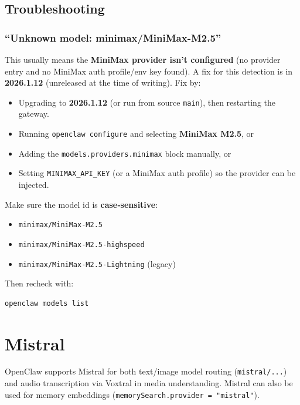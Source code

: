 \subsection{Troubleshooting}


\subsubsection{“Unknown model: minimax/MiniMax-M2.5”}


This usually means the \textbf{MiniMax provider isn’t configured} (no provider entry
and no MiniMax auth profile/env key found). A fix for this detection is in
\textbf{2026.1.12} (unreleased at the time of writing). Fix by:

\begin{itemize}
  \item Upgrading to \textbf{2026.1.12} (or run from source \texttt{main}), then restarting the gateway.
  \item Running \texttt{openclaw configure} and selecting \textbf{MiniMax M2.5}, or
  \item Adding the \texttt{models.providers.minimax} block manually, or
  \item Setting \texttt{MINIMAX\_API\_KEY} (or a MiniMax auth profile) so the provider can be injected.
\end{itemize}


Make sure the model id is \textbf{case‑sensitive}:

\begin{itemize}
  \item \texttt{minimax/MiniMax-M2.5}
  \item \texttt{minimax/MiniMax-M2.5-highspeed}
  \item \texttt{minimax/MiniMax-M2.5-Lightning} (legacy)
\end{itemize}


Then recheck with:

\begin{lstlisting}[language=bash]
openclaw models list
\end{lstlisting}



\clearpage

\section{Mistral}


OpenClaw supports Mistral for both text/image model routing (\texttt{mistral/...}) and
audio transcription via Voxtral in media understanding.
Mistral can also be used for memory embeddings (\texttt{memorySearch.provider = "mistral"}).

